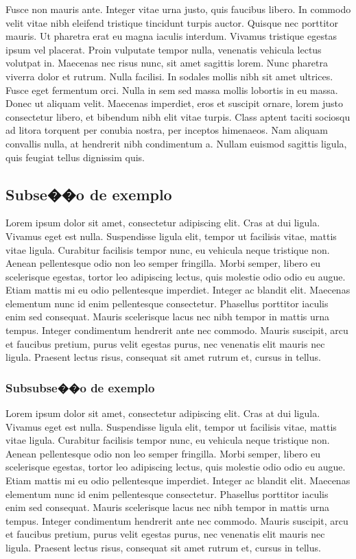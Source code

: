 \documentclass{ppgccufscar}
\begin{document}
Fusce non mauris ante. Integer vitae urna justo, quis faucibus libero. In commodo velit vitae nibh eleifend tristique tincidunt turpis auctor. Quisque nec porttitor mauris. Ut pharetra erat eu magna iaculis interdum. Vivamus tristique egestas ipsum vel placerat. Proin vulputate tempor nulla, venenatis vehicula lectus volutpat in. Maecenas nec risus nunc, sit amet sagittis lorem. Nunc pharetra viverra dolor et rutrum. Nulla facilisi. In sodales mollis nibh sit amet ultrices. Fusce eget fermentum orci. Nulla in sem sed massa mollis lobortis in eu massa. Donec ut aliquam velit. Maecenas imperdiet, eros et suscipit ornare, lorem justo consectetur libero, et bibendum nibh elit vitae turpis. Class aptent taciti sociosqu ad litora torquent per conubia nostra, per inceptos himenaeos. Nam aliquam convallis nulla, at hendrerit nibh condimentum a. Nullam euismod sagittis ligula, quis feugiat tellus dignissim quis.

\subsection{Subse��o de exemplo}

Lorem ipsum dolor sit amet, consectetur adipiscing elit. Cras at dui ligula. Vivamus eget est nulla. Suspendisse ligula elit, tempor ut facilisis vitae, mattis vitae ligula. Curabitur facilisis tempor nunc, eu vehicula neque tristique non. Aenean pellentesque odio non leo semper fringilla. Morbi semper, libero eu scelerisque egestas, tortor leo adipiscing lectus, quis molestie odio odio eu augue. Etiam mattis mi eu odio pellentesque imperdiet. Integer ac blandit elit. Maecenas elementum nunc id enim pellentesque consectetur. Phasellus porttitor iaculis enim sed consequat. Mauris scelerisque lacus nec nibh tempor in mattis urna tempus. Integer condimentum hendrerit ante nec commodo. Mauris suscipit, arcu et faucibus pretium, purus velit egestas purus, nec venenatis elit mauris nec ligula. Praesent lectus risus, consequat sit amet rutrum et, cursus in tellus.

\subsubsection{Subsubse��o de exemplo}

Lorem ipsum dolor sit amet, consectetur adipiscing elit. Cras at dui ligula. Vivamus eget est nulla. Suspendisse ligula elit, tempor ut facilisis vitae, mattis vitae ligula. Curabitur facilisis tempor nunc, eu vehicula neque tristique non. Aenean pellentesque odio non leo semper fringilla. Morbi semper, libero eu scelerisque egestas, tortor leo adipiscing lectus, quis molestie odio odio eu augue. Etiam mattis mi eu odio pellentesque imperdiet. Integer ac blandit elit. Maecenas elementum nunc id enim pellentesque consectetur. Phasellus porttitor iaculis enim sed consequat. Mauris scelerisque lacus nec nibh tempor in mattis urna tempus. Integer condimentum hendrerit ante nec commodo. Mauris suscipit, arcu et faucibus pretium, purus velit egestas purus, nec venenatis elit mauris nec ligula. Praesent lectus risus, consequat sit amet rutrum et, cursus in tellus.
\end{document}
